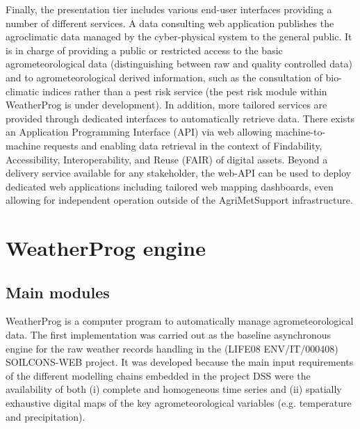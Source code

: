 \documentclass[authoryear,preprint,review,12pt]{elsarticle}
\newcommand{\note}[1]{\emph{\textcolor{red}{#1}}}
\begin{document}
Finally, the presentation tier includes various end-user interfaces providing a number of different services.
A data consulting web application publishes the agroclimatic data managed by the cyber-physical system to the general public.
It is in charge of providing a public or restricted access to the basic agrometeorological data (distinguishing between raw and quality controlled data) and to agrometeorological derived information, such as the consultation of bio-climatic indices rather than a pest risk service (the pest risk module within WeatherProg is under development).
In addition, more tailored services are provided through dedicated interfaces to automatically retrieve data. %
There exists an Application Programming Interface (API) via web allowing machine-to-machine requests and enabling data retrieval in the context of Findability, Accessibility, Interoperability, and Reuse (FAIR) of digital assets.
Beyond a delivery service available for any stakeholder, the web-API can be used to deploy dedicated web applications including tailored web mapping dashboards, even allowing for independent operation outside of the AgriMetSupport infrastructure. 

\section{WeatherProg engine}\label{sec:weatherprog}
\subsection{Main modules}
WeatherProg \citep{langella:weatherprog2014} is a computer program to automatically manage agrometeorological data.
The first implementation was carried out as the baseline asynchronous engine for the raw weather records handling in the (LIFE08 ENV/IT/000408) SOILCONS-WEB project.
It was developed because the main input requirements of the different modelling chains embedded in the project DSS \citep{Terribile:soilconsweb:2015} were the availability of both (i) complete and homogeneous time series and (ii) spatially exhaustive digital maps of the key agrometeorological variables (e.g. temperature and precipitation).
\end{document}
